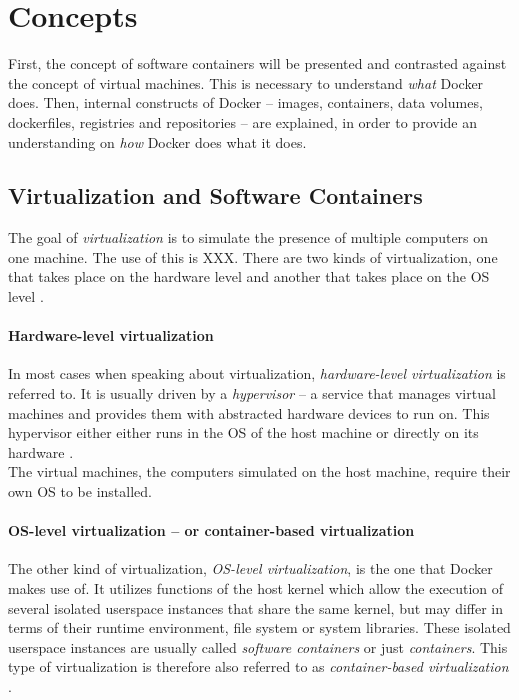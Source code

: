 
\section{Concepts} %
\label{sec:docker_concepts}

  First, the concept of software containers will be presented and contrasted against the concept of virtual machines. This is necessary to understand \emph{what} Docker does. Then, internal constructs of Docker -- images, containers, data volumes, dockerfiles, registries and repositories -- are explained, in order to provide an understanding on \emph{how} Docker does what it does.

  \subsection{Virtualization and Software Containers} %
  \label{sub:virtualization_and_software_containers}
    The goal of \emph{virtualization} is to simulate the presence of multiple computers on one machine. The use of this is XXX. There are two kinds of virtualization, one that takes place on the hardware level and another that takes place on the \ac{OS} level \cite{Ruiz2015Performance}.

    \paragraph{Hardware-level virtualization} %
    \label{par:hardware_level_virtualization}
      In most cases when speaking about virtualization, \emph{hardware-level virtualization} is referred to. It is usually driven by a \emph{hypervisor} -- a service that manages virtual machines and provides them with abstracted hardware devices to run on. This hypervisor either either runs in the OS of the host machine or directly on its hardware \cite{Ruiz2015Performance}. \\
      The virtual machines, \ie the computers simulated on the host machine, require their own OS to be installed.

    \paragraph{OS-level virtualization -- or container-based virtualization} %
    \label{par:os_level_virtualization}
      The other kind of virtualization, \emph{OS-level virtualization}, is the one that Docker makes use of.
      It utilizes functions of the host kernel which allow the execution of several isolated userspace instances that share the same kernel, but may differ in terms of their runtime environment, \eg file system or system libraries. These isolated userspace instances are usually called \emph{software containers} or just \emph{containers}. This type of virtualization is therefore also referred to as \emph{container-based virtualization} \cite{Ruiz2015Performance}. \\

